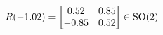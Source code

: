 \documentclass[preview]{standalone}
\begin{document}
\begin{align*}
\special{dvisvgm:raw <g id='unique000'>}R(-1.02) = \begin{bmatrix} 0.52 & 0.85 \\ -0.85 & 0.52 \end{bmatrix} \in \text{SO}(2)\special{dvisvgm:raw </g>}
\end{align*}
\end{document}

